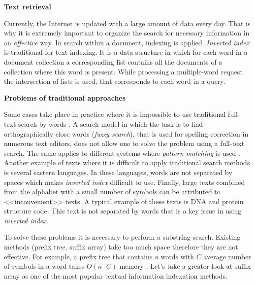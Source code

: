 
\textbf{Text retrieval}

Currently, the Internet is updated with a large amount of data every day.
That is why it is extremely important to organize the search for necessary information in an \emph{effective} way.
In search within a document, indexing is applied.
\emph{Inverted index} is traditional for text indexing.
It is a data structure in which for each word in a document collection a corresponding list
contains all the documents of a collection where this word is present.
While processing a multiple-word request the intersection of lists is used,
that corresponds to each word in a query.

\textbf{Problems of traditional approaches}

Some cases take place in practice where it is impossible to use
traditional full-text search by words \cite{bast2013efficient}.
A search model in which the task is to find orthographically close words (\emph{fuzzy search}),
that is used for spelling correction in numerous text editors,
does not allow one to solve the problem using a full-text search.
The same applies to different systems where \emph{pattern matching} is used \cite{bai2018adaptive}.
Another example of texts where it is difficult to apply traditional search methods
is several eastern languages.
In these languages, words are not separated by spaces which makes \emph{inverted index} difficult to use.
Finally, large texts combined from the alphabet with a small number of symbols
can be attributed to <<inconvenient>> texts.
A typical example of these texts is DNA and protein structure code.
This text is not separated by words that is a key issue in using \emph{inverted index}.

To solve these problems it is necessary to perform a substring search.
Existing methods (prefix tree, suffix array) take too much space therefore they are not effective.
For example, a prefix tree that contains \emph{n} words with $C$ average number of symbols in a word
takes $O(n \cdot C)$ memory \cite{aho1975efficient}.
Let's take a greater look at suffix array as one of the most popular textual information indexation methods.

